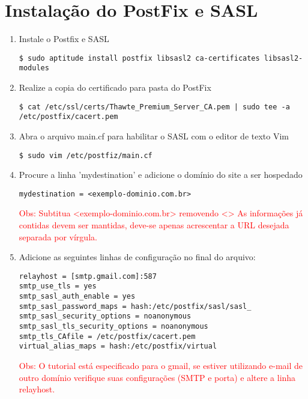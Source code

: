 \section{Instalação do PostFix e SASL}

\begin{enumerate}[label=\alph*)]

\item Instale o Postfix e SASL
\begin{lstlisting}
$ sudo aptitude install postfix libsasl2 ca-certificates libsasl2-modules
\end{lstlisting}

\item Realize a copia do certificado para pasta do PostFix
\begin{lstlisting}
$ cat /etc/ssl/certs/Thawte_Premium_Server_CA.pem | sudo tee -a /etc/postfix/cacert.pem
\end{lstlisting}

\item Abra o arquivo main.cf para habilitar o SASL com o editor de texto Vim
\begin{lstlisting}
$ sudo vim /etc/postfiz/main.cf
\end{lstlisting}

\item Procure a linha 'mydestination' e adicione o domínio do site a ser hospedado
\begin{lstlisting}
mydestination = <exemplo-dominio.com.br>
\end{lstlisting}

\textcolor{red}{{\scriptsize  Obs: Subtitua <exemplo-dominio.com.br> removendo <> }}
\textcolor{red}{{\scriptsize  As informações já contidas devem ser mantidas, deve-se apenas acrescentar a URL desejada separada por vírgula. }}

\item Adicione as seguintes linhas de configuração no final do arquivo:

\begin{lstlisting}
relayhost = [smtp.gmail.com]:587
smtp_use_tls = yes
smtp_sasl_auth_enable = yes
smtp_sasl_password_maps = hash:/etc/postfix/sasl/sasl_
smtp_sasl_security_options = noanonymous
smtp_sasl_tls_security_options = noanonymous
smtp_tls_CAfile = /etc/postfix/cacert.pem
virtual_alias_maps = hash:/etc/postfix/virtual
\end{lstlisting}

\textcolor{red}{{\scriptsize Obs: O tutorial está especificado para o gmail, se estiver utilizando e-mail de outro domínio verifique suas configurações (SMTP e porta) e altere a linha relayhost.}}


\end{enumerate}
